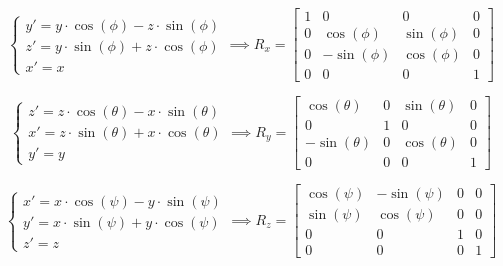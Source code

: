 \documentclass[12pt]{article}
\begin{document}
\begin{equation}
    \begin{cases}
        y' = y \cdot \cos(\phi) - z \cdot \sin(\phi) \\
        z' = y \cdot \sin(\phi) + z \cdot \cos(\phi) \\
        x' = x
    \end{cases}
    \implies
    R_x =
    \begin{bmatrix}
        1 & 0           &           0 & 0 \\
        0 &  \cos(\phi) &  \sin(\phi) & 0 \\ 
        0 & -\sin(\phi) &  \cos(\phi) & 0 \\
        0 & 0           &           0 & 1 
    \end{bmatrix}    
\end{equation}


\begin{equation}
    \begin{cases}
        z' = z \cdot \cos(\theta) - x \cdot \sin(\theta) \\
        x' = z \cdot \sin(\theta) + x \cdot \cos(\theta) \\
        y' = y
    \end{cases} 
    \implies
    R_y =
    \begin{bmatrix}
        \cos(\theta)  & 0 &  \sin(\theta) & 0 \\ 
        0             & 1 &            0  & 0 \\
        -\sin(\theta) & 0 &  \cos(\theta) & 0 \\
        0             & 0 &            0  & 1 
    \end{bmatrix}
\end{equation}


\begin{equation}
    \begin{cases}
        x' = x \cdot \cos(\psi) - y \cdot \sin(\psi) \\
        y' = x \cdot \sin(\psi) + y \cdot \cos(\psi) \\
        z' = z 
    \end{cases}
    \implies
    R_z =
    \begin{bmatrix}
        \cos(\psi) & -\sin(\psi) & 0 & 0 \\ 
        \sin(\psi) &  \cos(\psi) & 0 & 0 \\
        0          &           0 & 1 & 0 \\
        0          &           0 & 0 & 1 
    \end{bmatrix}
\end{equation}
\end{document}

